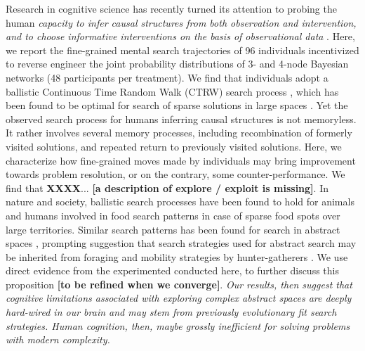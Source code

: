 Research in cognitive science has recently turned its attention to probing the human {\it capacity to infer causal structures from both observation and intervention, and to choose informative interventions on the basis of observational data} \cite{steyvers2003inferring,pearl2009causality}. Here, we report the fine-grained mental search trajectories of 96 individuals incentivized to reverse engineer the joint probability distributions of 3- and 4-node Bayesian networks (48 participants per treatment). We find that individuals adopt a ballistic Continuous Time Random Walk (CTRW) search process \cite{}, which has been found to be optimal for search of sparse solutions in large spaces \cite{viswanathan1999optimizing,edwards2007revisiting,song2010modelling,viswanathan2011physics}. Yet the observed search process for humans inferring causal structures is not memoryless. It rather involves several memory processes, including recombination of formerly visited solutions, and repeated return to previously visited solutions. Here, we characterize how fine-grained moves made by individuals may bring improvement towards problem resolution, or on the contrary, some counter-performance. We find that {\bf XXXX}... {\bf [a description of explore / exploit is missing]}. In nature and society, ballistic search processes have been found to hold for animals \cite{baronchelli2013levy} and humans \cite{gonzalez2008understanding,song2010modelling,rhee2011levy} involved in food search patterns in case of sparse food spots over large territories. Similar search patterns has been found for search in abstract spaces \cite{rhodes2007human,radicchi2012rationality,radicchi2012evolution}, prompting suggestion that search strategies used for abstract search \cite{baronchelli2013levy} may be inherited from foraging and mobility strategies by hunter-gatherers \cite{brown2007levy,raichlen2014evidence}. We use direct evidence from the experimented conducted here, to further discuss this proposition {\bf [to be refined when we converge]}. {\it Our results, then suggest that cognitive limitations associated with exploring complex abstract spaces are deeply hard-wired in our brain and may stem from previously evolutionary fit search strategies.  Human cognition, then, maybe grossly inefficient for solving problems with modern complexity.}
